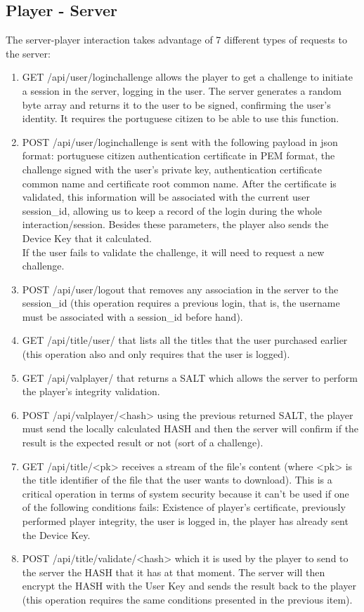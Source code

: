 \documentclass[11pt,a4paper]{report}
\begin{document}
\subsection{Player - Server}
The server-player interaction takes advantage of 7 different types of requests to the server:
\begin{enumerate}
\item GET /api/user/loginchallenge allows the player to get a challenge to initiate a session in the server, logging in the user. The server generates a random byte array and returns it to the user to be signed, confirming the user's identity. It requires the portuguese citizen to be able to use this function.
\item POST  /api/user/loginchallenge is sent with the following payload in json format: portuguese citizen authentication certificate in PEM format, the challenge signed with the user's private key, authentication certificate common name and certificate root common name. 
    After the certificate is validated, this information will be associated with the current user session\_id, allowing us to keep a record of the login during the whole interaction/session. Besides these parameters, the player also sends the Device Key that it calculated.\\
    If the user fails to validate the challenge, it will need to request a new challenge.
\item POST  /api/user/logout that removes any association in the server to the session\_id (this operation requires a previous login, that is, the username must be associated with a session\_id before hand).
\item GET   /api/title/user/ that lists all the titles that the user purchased earlier (this operation also and only requires that the user is logged).
\item GET   /api/valplayer/ that returns a SALT which allows the server to perform the player's integrity validation.
\item POST  /api/valplayer/<hash> using the previous returned SALT, the player must send the locally calculated HASH and then the server will confirm if the result is the expected result or not (sort of a challenge).
\item GET   /api/title/<pk> receives a stream of the file's content (where <pk> is the title identifier of the file that the user wants to download). This is a critical operation in terms of system security because it can't be used if one of the following conditions fails: Existence of player's certificate, previously performed player integrity, the user is logged in, the player has already sent the Device Key.
\item POST  /api/title/validate/<hash> which it is used by the player to send to the server the HASH that it has at that moment. The server will then encrypt the HASH with the User Key and sends the result back to the player (this operation requires the same conditions presented in the previous item).
\end{enumerate}
\end{document}

